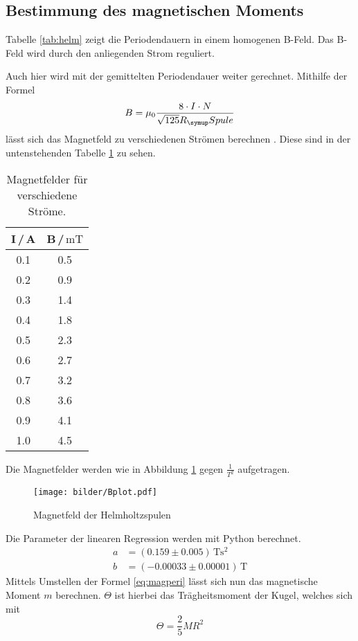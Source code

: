 \subsection{Bestimmung des magnetischen Moments}
Tabelle \ref{tab:helm} zeigt die Periodendauern in einem homogenen B-Feld. Das
B-Feld wird durch den anliegenden Strom reguliert.

Auch hier wird mit der gemittelten Periodendauer weiter gerechnet.
Mithilfe der Formel
\begin{equation*}
  B=\mu_0\frac{8\cdot I\cdot N}{\sqrt{125}R_\su{Spule}}
\end{equation*}
lässt sich das Magnetfeld zu verschiedenen Strömen berechnen \cite{bfeld}.
Diese sind in der untenstehenden Tabelle \ref{tab:bfeld} zu sehen.
\begin{table}
  \centering
  \begin{tabular}{c c}
    \toprule
    I\,/\,A & B\,/\,$\si{\milli\tesla}$\\
    \midrule
    0.1 &  0.5 \\
    0.2 &  0.9 \\
    0.3 &  1.4 \\
    0.4 &  1.8 \\
    0.5 &  2.3 \\
    0.6 &  2.7 \\
    0.7 &  3.2 \\
    0.8 &  3.6 \\
    0.9 &  4.1 \\
    1.0 &  4.5 \\
    \bottomrule
  \end{tabular}
  \caption{Magnetfelder für verschiedene Ströme.}
  \label{tab:bfeld}
\end{table}
Die Magnetfelder werden wie in Abbildung \ref{fig:Bplot} gegen $\frac{1}{T^2}$
aufgetragen.
\begin{figure}
  \centering
  \texttt{[image: bilder/Bplot.pdf]}
  \caption{Magnetfeld der Helmholtzspulen}
  \label{fig:Bplot}
\end{figure}
Die Parameter der linearen Regression werden mit Python berechnet.
\begin{align*}
  a &= (0.159   \pm 0.005 )\,\si{\tesla\square\second} \\
  b &= (-0.00033 \pm 0.00001)\,\si{\tesla}
\end{align*}
Mittels Umstellen der Formel \eqref{eq:magperi} lässt sich nun das magnetische
Moment $m$ berechnen. $\Theta$ ist hierbei das Trägheitsmoment der Kugel, welches
sich mit
\begin{equation*}
  \Theta = \frac{2}{5}MR^2
\end{equation*}
